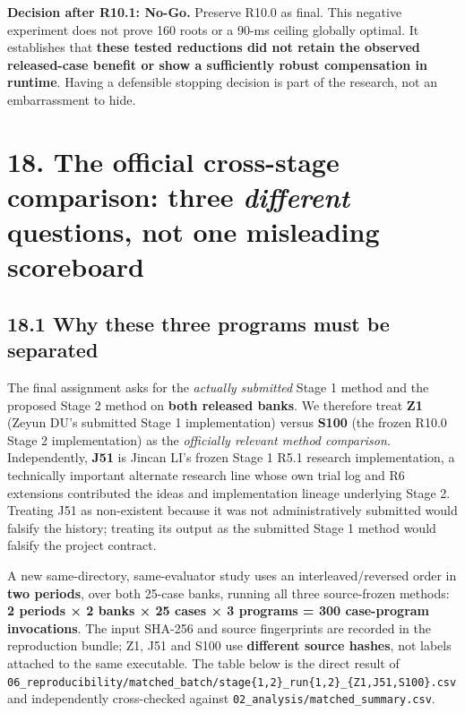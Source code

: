 \documentclass[a4paper,10pt]{article}
\theoremstyle{definition}
\theoremstyle{remark}
\begin{document}
\begin{tcolorbox}[colback=ResearchBlue!6!white,colframe=ResearchSlate!55!white,boxrule=0.65pt,arc=1mm,breakable]
\textbf{Decision after R10.1: No-Go.} Preserve R10.0 as final. This negative experiment does not prove 160 roots or a 90-ms ceiling globally optimal. It establishes that \textbf{these tested reductions did not retain the observed released-case benefit or show a sufficiently robust compensation in runtime}. Having a defensible stopping decision is part of the research, not an embarrassment to hide.
\end{tcolorbox}

\section{\texorpdfstring{18. The official cross-stage comparison: three \emph{different} questions, not one misleading scoreboard}{18. The official cross-stage comparison: three different questions, not one misleading scoreboard}}\label{the-official-cross-stage-comparison-three-different-questions-not-one-misleading-scoreboard}

\subsection{18.1 Why these three programs must be separated}\label{why-these-three-programs-must-be-separated}

The final assignment asks for the \emph{actually submitted} Stage 1 method and the proposed Stage 2 method on \textbf{both released banks}. We therefore treat \textbf{Z1} (Zeyun DU's submitted Stage 1 implementation) versus \textbf{S100} (the frozen R10.0 Stage 2 implementation) as the \emph{officially relevant method comparison}. Independently, \textbf{J51} is Jincan LI's frozen Stage 1 R5.1 research implementation, a technically important alternate research line whose own trial log and R6 extensions contributed the ideas and implementation lineage underlying Stage 2. Treating J51 as non-existent because it was not administratively submitted would falsify the history; treating its output as the submitted Stage 1 method would falsify the project contract.

A new same-directory, same-evaluator study uses an interleaved/reversed order in \textbf{two periods}, over both 25-case banks, running all three source-frozen methods: \textbf{2 periods × 2 banks × 25 cases × 3 programs = 300 case-program invocations}. The input SHA-256 and source fingerprints are recorded in the reproduction bundle; Z1, J51 and S100 use \textbf{different source hashes}, not labels attached to the same executable. The table below is the direct result of \texttt{06\_reproducibility/matched\_batch/stage\{1,2\}\_run\{1,2\}\_\{Z1,J51,S100\}.csv} and independently cross-checked against \texttt{02\_analysis/matched\_summary.csv}.
\end{document}
